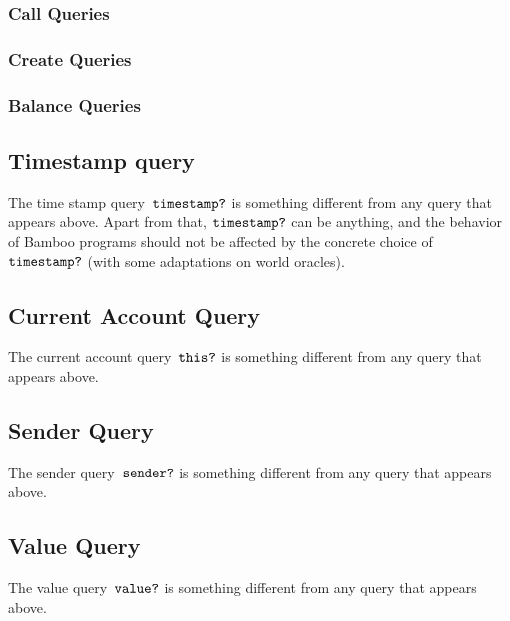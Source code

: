\documentclass{book}
\begin{document}
\subsubsection{Call Queries}

\subsubsection{Create Queries}

\subsubsection{Balance Queries}

\subsection{Timestamp query}

\newcommand{\timestampQuery}{\text{\texttt{timestamp?}}}
The time stamp query~$\timestampQuery$ is something different from any query that appears above. Apart from that, $\timestampQuery$ can be anything, and the behavior of Bamboo programs should not be affected by the concrete choice of $\timestampQuery$ (with some adaptations on world oracles).

\subsection{Current Account Query}

\newcommand{\thisQuery}[0]{\text{\texttt{this?}}}

The current account query~$\thisQuery$ is something different from any query that appears above.

\subsection{Sender Query}

\newcommand{\senderQuery}{\text{\texttt{sender?}}}

The sender query~$\senderQuery$ is something different from any query that appears above.

\subsection{Value Query}

\newcommand{\valueQuery}{\text{\texttt{value?}}}

The value query~$\valueQuery$ is something different from any query that appears above.
\end{document}
